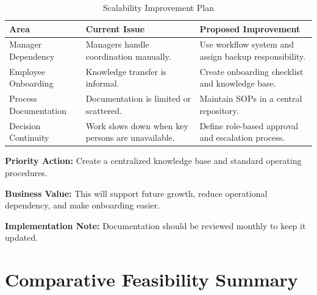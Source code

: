 \documentclass[12pt,a4paper]{report}
\begin{document}
\begin{table}[H]
\centering
\caption{Scalability Improvement Plan}
\renewcommand{\arraystretch}{1.3}
\begin{tabularx}{\textwidth}{|p{4cm}|X|X|}
\hline
\rowcolor{secondary}
\textbf{Area} & \textbf{Current Issue} & \textbf{Proposed Improvement} \\
\hline
Manager Dependency & Managers handle coordination manually. & Use workflow system and assign backup responsibility. \\
\hline
Employee Onboarding & Knowledge transfer is informal. & Create onboarding checklist and knowledge base. \\
\hline
Process Documentation & Documentation is limited or scattered. & Maintain SOPs in a central repository. \\
\hline
Decision Continuity & Work slows down when key persons are unavailable. & Define role-based approval and escalation process. \\
\hline
\end{tabularx}
\end{table}

\begin{recommendBox}
\textbf{Priority Action:} Create a centralized knowledge base and standard operating procedures.

\textbf{Business Value:} This will support future growth, reduce operational dependency, and make onboarding easier.

\textbf{Implementation Note:} Documentation should be reviewed monthly to keep it updated.
\end{recommendBox}

\section{Comparative Feasibility Summary}
\end{document}
